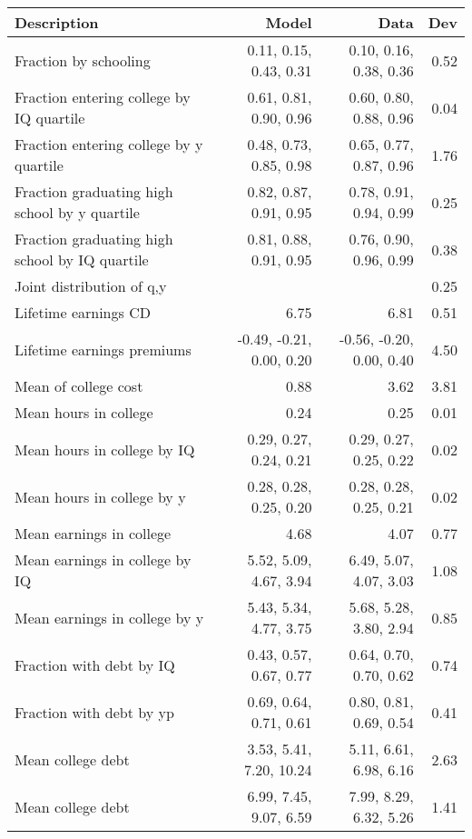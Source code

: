 \begin{tabular}{lrrr}
\hline
Description & Model  & Data  & Dev  \\ 
\hline
Fraction by schooling & 0.11, 0.15, 0.43, 0.31  & 0.10, 0.16, 0.38, 0.36  & 0.52  \\ 
Fraction entering college by IQ quartile & 0.61, 0.81, 0.90, 0.96  & 0.60, 0.80, 0.88, 0.96  & 0.04  \\ 
Fraction entering college by y quartile & 0.48, 0.73, 0.85, 0.98  & 0.65, 0.77, 0.87, 0.96  & 1.76  \\ 
Fraction graduating high school by y quartile & 0.82, 0.87, 0.91, 0.95  & 0.78, 0.91, 0.94, 0.99  & 0.25  \\ 
Fraction graduating high school by IQ quartile & 0.81, 0.88, 0.91, 0.95  & 0.76, 0.90, 0.96, 0.99  & 0.38  \\ 
Joint distribution of q,y &   &   & 0.25  \\ 
Lifetime earnings CD & 6.75  & 6.81  & 0.51  \\ 
Lifetime earnings premiums & -0.49, -0.21, 0.00, 0.20  & -0.56, -0.20, 0.00, 0.40  & 4.50  \\ 
Mean of college cost & 0.88  & 3.62  & 3.81  \\ 
Mean hours in college & 0.24  & 0.25  & 0.01  \\ 
Mean hours in college by IQ & 0.29, 0.27, 0.24, 0.21  & 0.29, 0.27, 0.25, 0.22  & 0.02  \\ 
Mean hours in college by y & 0.28, 0.28, 0.25, 0.20  & 0.28, 0.28, 0.25, 0.21  & 0.02  \\ 
Mean earnings in college & 4.68  & 4.07  & 0.77  \\ 
Mean earnings in college by IQ & 5.52, 5.09, 4.67, 3.94  & 6.49, 5.07, 4.07, 3.03  & 1.08  \\ 
Mean earnings in college by y & 5.43, 5.34, 4.77, 3.75  & 5.68, 5.28, 3.80, 2.94  & 0.85  \\ 
Fraction with debt by IQ & 0.43, 0.57, 0.67, 0.77  & 0.64, 0.70, 0.70, 0.62  & 0.74  \\ 
Fraction with debt by yp & 0.69, 0.64, 0.71, 0.61  & 0.80, 0.81, 0.69, 0.54  & 0.41  \\ 
Mean college debt & 3.53, 5.41, 7.20, 10.24  & 5.11, 6.61, 6.98, 6.16  & 2.63  \\ 
Mean college debt & 6.99, 7.45, 9.07, 6.59  & 7.99, 8.29, 6.32, 5.26  & 1.41  \\ 
\hline
\end{tabular}%
